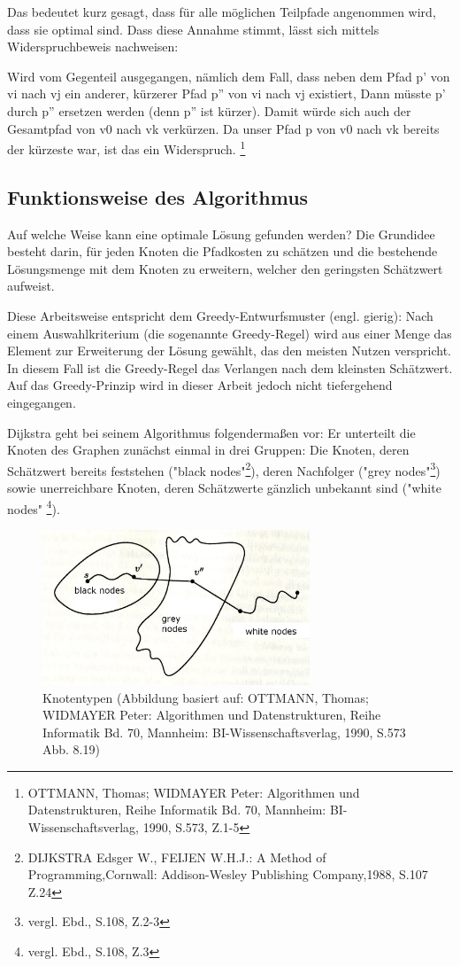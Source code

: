 \parindent0pt Das bedeutet kurz gesagt, dass  für alle möglichen Teilpfade angenommen wird, dass sie optimal sind.
Dass diese Annahme stimmt, lässt sich mittels Widerspruchbeweis nachweisen: 

\parindent0pt Wird vom Gegenteil ausgegangen, nämlich dem Fall, dass neben dem Pfad p' von v{\tiny i} nach v{\tiny j} ein anderer, kürzerer Pfad p'' von v{\tiny i }nach v{\tiny j} existiert, Dann müsste p' durch p'' ersetzen werden (denn p'' ist kürzer). Damit würde sich auch der Gesamtpfad von v{\tiny 0} nach v{\tiny k} verkürzen. Da unser Pfad p von v{\tiny 0} nach v{\tiny k} bereits der kürzeste war, ist das  ein Widerspruch. \footnote{OTTMANN, Thomas; WIDMAYER Peter: Algorithmen und Datenstrukturen, Reihe Informatik Bd. 70, Mannheim: BI-Wissenschaftsverlag, 1990, S.573, Z.1-5}


\subsection{Funktionsweise des Algorithmus}
Auf welche Weise kann eine optimale Lösung gefunden werden?
Die Grundidee besteht darin, für jeden Knoten die Pfadkosten zu schätzen und die bestehende Lösungsmenge mit dem Knoten zu erweitern, welcher den geringsten Schätzwert aufweist. 

\parindent0pt Diese Arbeitsweise entspricht dem Greedy-Entwurfsmuster (engl. gierig): Nach einem Auswahlkriterium (die sogenannte Greedy-Regel) wird aus einer Menge das Element zur Erweiterung der Lösung gewählt, das den meisten Nutzen verspricht. In diesem Fall ist die Greedy-Regel das Verlangen nach dem kleinsten Schätzwert.
Auf das Greedy-Prinzip wird in dieser Arbeit jedoch nicht tiefergehend eingegangen.

\parindent0pt Dijkstra geht bei seinem Algorithmus folgendermaßen vor: Er unterteilt die Knoten des Graphen zunächst einmal in drei Gruppen: Die Knoten, deren Schätzwert bereits feststehen ("black nodes"\footnote{DIJKSTRA Edsger W., FEIJEN W.H.J.: A Method of Programming,Cornwall: Addison-Wesley Publishing Company,1988, S.107 Z.24}), deren Nachfolger ("grey nodes"\footnote{vergl. Ebd., S.108, Z.2-3}) sowie unerreichbare Knoten, deren Schätzwerte gänzlich unbekannt sind ("white nodes" \footnote{vergl. Ebd., S.108, Z.3}).

\begin{figure}[h]
\centering
\includegraphics[width = 8cm]{./chapters/knotentypen.jpg}
\caption{Knotentypen {\tiny (Abbildung basiert auf: OTTMANN, Thomas; WIDMAYER Peter: Algorithmen und Datenstrukturen, Reihe Informatik Bd. 70, Mannheim: BI-Wissenschaftsverlag, 1990, S.573 Abb. 8.19)} }
\label{a5}
\end{figure}



